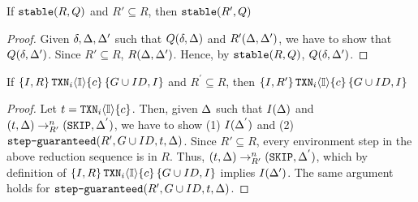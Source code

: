 \documentclass[acmlarge,anonymous]{acmart}\settopmatter{printfolios=true}
\begin{document}
%

\begin{lemma}
If $\mathtt{stable}(R, Q)$ and $R' \subseteq R$, then $\mathtt{stable}(R', Q)$
\end{lemma}
\begin{proof}
Given $\delta, \Delta, \Delta'$ such that $Q(\delta, \Delta)$ and $R'(\Delta, \Delta')$, we have to show that $Q(\delta, \Delta')$. Since $R' \subseteq R$, $R(\Delta, \Delta')$. Hence, by $\mathtt{stable}(R,Q)$, $Q(\delta, \Delta')$.
\end{proof}

\begin{lemma}
If $\{I,R\}\,{\tt TXN}_{i}\langle \mathbb{I} \rangle\{c\}\,\{G \cup ID,I\}$ and $R^{'} \subseteq R$, then $\{I,R'\}\,{\tt TXN}_{i}\langle \mathbb{I} \rangle\{c\}\,\{G \cup ID,I\}$
\end{lemma}
\begin{proof}
Let $t = {\tt TXN}_{i}\langle \mathbb{I} \rangle\{c\}$. Then, given $\Delta$ such that $I(\Delta)$ and $(t, \Delta) \rightarrow_{R'}^{n} ({\tt SKIP}, \Delta^{'})$, we have to show (1) $I(\Delta^{'})$ and (2) $\texttt{step-guaranteed}(R', G \cup ID, t, \Delta)$. Since $R' \subseteq R$, every environment step in the above reduction sequence is in $R$. Thus,  $(t, \Delta) \rightarrow_{R'}^{n} ({\tt SKIP}, \Delta^{'})$, which by definition of $\{I,R\}\,{\tt TXN}_{i}\langle \mathbb{I} \rangle\{c\}\,\{G \cup ID,I\}$ implies $I(\Delta')$. The same argument holds for $\texttt{step-guaranteed}(R', G \cup ID, t, \Delta)$.
\end{proof}
\end{document}
